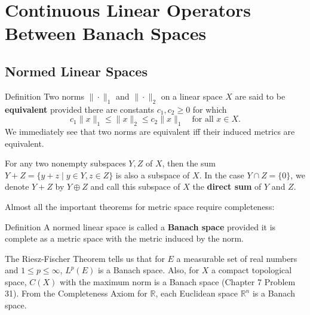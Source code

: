 \chapter{Continuous Linear Operators Between Banach Spaces}

\section{Normed Linear Spaces}

\begin{namedthm*}{Definition}
    Two norms $\|\cdot\|_1$ and $\|\cdot\|_2$ on a linear space $X$ are said to be \textbf{equivalent} provided there are constants $c_1,c_2\ge0$ for which
    \[
        c_1\|x\|_1\le\|x\|_2\le c_2\|x\|_1\quad\text{for all }x\in X.
    \]
    We immediately see that two norms are equivalent iff their induced metrics are equivalent.
\end{namedthm*}

For any two nonempty subspaces $Y,Z$ of $X$, then the sum $Y+Z=\{y+z\mid y\in Y,z\in Z\}$ is also a subspace of $X$.
In the case $Y\cap Z=\{0\}$, we denote $Y+Z$ by $Y\oplus Z$ and call this subspace of $X$ the \textbf{direct sum} of $Y$ and $Z$.

Almost all the important theorems for metric space require completeness:
\begin{namedthm*}{Definition}
    A normed linear space is called a \textbf{Banach space} provided it is complete as a metric space with the metric induced by the norm.
\end{namedthm*}
The Riesz-Fischer Theorem tells us that for $E$ a measurable set of real numbers and $1\le p\le\infty$, $L^p(E)$ is a Banach space.
Also, for $X$ a compact topological space, $C(X)$ with the maximum norm is a Banach space (Chapter 7 Problem 31).
From the Completeness Axiom for $\mathbb{R}$, each Euclidean space $\mathbb{R}^n$ is a Banach space.

